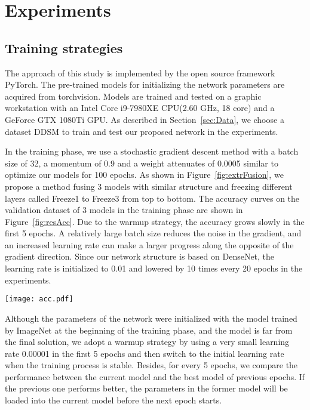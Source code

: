 \section{Experiments}
\label{sec:Exp}

\subsection{Training strategies}
\label{sec:ExpStra}

The approach of this study is implemented by 
the open source framework PyTorch. 
\cite{Abadi2016}
The pre-trained models for initializing the 
network parameters are acquired from 
torchvision.
\cite{Paszke2017}
Models are trained and tested on a graphic 
workstation with an Intel Core i9-7980XE 
CPU(2.60 GHz, 18 core) and a GeForce GTX 
1080Ti GPU. As described in 
Section~\ref{sec:Data}, 
we choose a dataset DDSM to train and test 
our proposed network in the experiments. 

In the training phase, we use a stochastic 
gradient descent method with a batch size of 32, 
\cite{Ioffe2015}
a momentum of 0.9 and a weight attenuates of 
0.0005 similar to optimize our models 
for 100 epochs. As shown in 
Figure~\ref{fig:extrFusion}, 
we propose a method fusing 3 models with 
similar structure and freezing different 
layers called Freeze1 to Freeze3 from top to 
bottom. The accuracy curves on the 
validation dataset of 3 models in the 
training phase are shown in 
Figure~\ref{fig:resAcc}. 
Due to the warmup strategy,
\cite{Glorot2011}
the accuracy grows 
slowly in the first 5 epochs. A relatively 
large batch size reduces the noise in the 
gradient, and an increased learning rate 
can make a larger progress along the 
opposite of the gradient direction.
\cite{Liu2020}
Since our network structure is based on 
DenseNet, the learning rate is initialized to 
0.01 and lowered by 10 times every 20 
epochs in the experiments.
\cite{Jia2014}

\begin{figure*}[!ht]
    \centering
    \texttt{[image: acc.pdf]}
    \caption{Validation accuracy.}
    \label{fig:resAcc}
\end{figure*}

Although the parameters of the network 
were initialized with the model trained by 
ImageNet at the beginning of the training 
phase, and the model is far from the final 
solution, we adopt a warmup strategy by using 
a very small learning rate 0.00001 in the 
first 5 epochs and then switch to the 
initial learning rate when the training 
process is stable. Besides, for every 5 
epochs, we compare the performance between 
the current model and the best model of 
previous epochs. If the previous one 
performs better, the parameters in the 
former model will be loaded into the 
current model before the next epoch starts.

